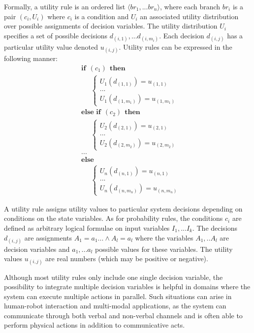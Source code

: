 Formally, a utility rule is an ordered list $\langle br_1, ... br_n\rangle$, where each branch $br_i$ is a pair $(c_i, U_i)$ where $c_i$ is a condition and $U_i$ an associated utility distribution over possible assignments of decision variables. The utility distribution $U_i$ specifies a set of possible decisions $d_{(i,1)},... d_{(i,m_i)}$.  Each decision $d_{(i,j)}$ has a particular utility value denoted $u_{(i,j)}$.  Utility rules can be expressed in the following manner:
\begin{equation}
\begin{aligned}
& \textbf{if} \ \ (c_{1}) \ \ \textbf{then} \\ 
& \;\;\;\;\; \begin{cases}
U_1(d_{(1,1)}) = u_{(1,1)} \\
 ... \\
U_1(d_{(1,m_1)}) = u_{(1,m_1)} 
\end{cases} \\[3mm]
& \textbf{else if} \ \ (c_{2}) \ \ \textbf{then} \\ 
& \;\;\;\;\; \begin{cases}
U_2(d_{(2,1)}) = u_{(2,1)} \\
 ... \\
U_2(d_{(2,m_2)}) = u_{(2,m_2)} 
\end{cases} \\
& ...  \\
& \textbf{else} \\
& \;\;\;\;\; \begin{cases}
U_n(d_{(n,1)}) = u_{(n,1)} \\
... \\
U_n(d_{(n,m_n)}) = u_{(n,m_n)}
\end{cases}
\end{aligned}
\end{equation}

A utility rule assigns utility values to particular system decisions depending on conditions on the state variables.  As for probability rules, the conditions $c_i$ are defined as arbitrary logical formulae on input variables $I_1,... I_k$.  The decisions $d_{(i,j)}$ are assignments $A_1\!=\!a_1 ... \land A_{l}\!=\!a_{l}$ where the variables $A_1,..A_{l}$ are decision variables and $a_1,...a_{l}$ possible values for these variables. The utility values $u_{(i,j)}$ are real numbers (which may be positive or negative).  

Although most utility rules only include one single decision variable, the possibility to integrate multiple decision variables is helpful in domains where the system can execute multiple actions in parallel. Such situations can arise in human-robot interaction and multi-modal applications, as the system can communicate through both verbal and non-verbal channels and is often able to perform physical actions in addition to communicative acts. 
 
